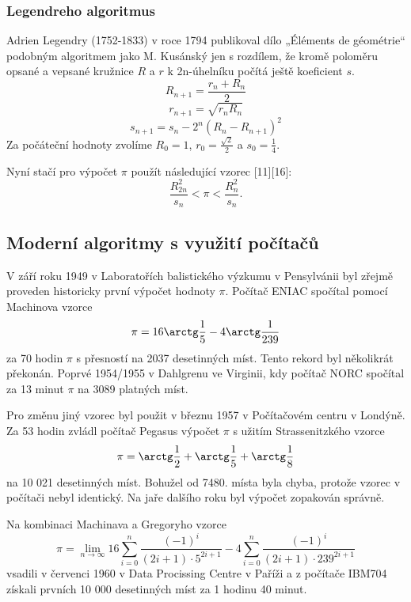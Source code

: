 \documentclass[soc]{gzwroc} %
\begin{document}
\subsubsection{Legendreho algoritmus}
Adrien Legendry (1752-1833) v roce 1794 publikoval dílo „Éléments de géométrie“ podobným algoritmem jako M. Kusánský jen s rozdílem, že kromě poloměru opsané a vepsané kružnice $R$ a $r$ k 2n-úhelníku počítá ještě koeficient $s$.
\begin{equation}
R_{n+1}=\frac{r_n+R_n}{2}
\end{equation}
\begin{equation}
r_{n+1}=\sqrt{r_nR_n}
\end{equation}
\begin{equation}
s_{n+1}=s_n-2^n(R_n-R_{n+1})^2
\end{equation}
Za počáteční hodnoty zvolíme $R_0=1$, $r_0=\frac{\sqrt{2}}{2}$ a $s_0=\frac{1}{4}$.

Nyní stačí pro výpočet $\pi$ použít následující vzorec [11][16]:
\begin{equation}
\frac{R_{2n}^2}{s_n}<\pi<\frac{R_n^2}{s_n}.
\end{equation}
\subsection{Moderní algoritmy s využití počítačů}
V září roku 1949 v Laboratořích balistického výzkumu v Pensylvánii byl zřejmě proveden historicky první výpočet hodnoty $\pi$. Počítač ENIAC spočítal pomocí Machinova vzorce
\begin{equation}
\pi=16\arctg\frac{1}{5}-4\arctg\frac{1}{239}
\end{equation}
za 70 hodin $\pi$ s přesností na 2037 desetinných míst. Tento rekord byl několikrát překonán. Poprvé 1954/1955 v Dahlgrenu ve Virginii, kdy počítač NORC spočítal za 13 minut $\pi$ na 3089 platných míst.

Pro změnu jiný vzorec byl použit v březnu 1957 v Počítačovém centru v Londýně. Za 53 hodin zvládl počítač Pegasus výpočet $\pi$ s užitím Strassenitzkého vzorce
\begin{equation}
\pi=\arctg\frac{1}{2}+\arctg\frac{1}{5}+\arctg\frac{1}{8}
\end{equation}
na 10 021 desetinných míst. Bohužel od 7480. místa byla chyba, protože vzorec v počítači nebyl identický. Na jaře dalšího roku byl výpočet zopakován správně.

Na kombinaci Machinava a Gregoryho vzorce
\begin{equation}
\pi=\lim_{n\to\infty}16\sum_{i=0}^n \frac{(-1)^i}{(2i+1)\cdot5^{2i+1}}-4\sum_{i=0}^n \frac{(-1)^i}{(2i+1)\cdot239^{2i+1}}
\end{equation}
vsadili v červenci 1960 v Data Procissing Centre v Paříži a z počítače IBM704 získali prvních 10 000 desetinných míst za 1 hodinu 40 minut.
 
\end{document}
